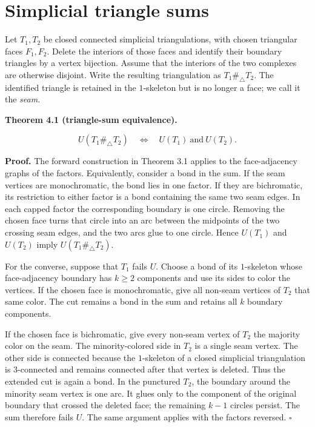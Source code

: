 \documentclass[11pt]{article}
\begin{document}
\section{Simplicial triangle sums}


Let $T_1,T_2$ be closed connected simplicial triangulations, with chosen
triangular faces $F_1,F_2$. Delete the interiors of those faces and identify
their boundary triangles by a vertex bijection. Assume that the interiors of
the two complexes are otherwise disjoint. Write the resulting triangulation
as $T_1\mathbin{\#_\triangle}T_2$. The identified triangle is retained in the
$1$-skeleton but is no longer a face; we call it the \emph{seam}.

\textbf{Theorem 4.1 (triangle-sum equivalence).}

\[
U(T_1\mathbin{\#_\triangle}T_2)
\quad\Longleftrightarrow\quad
U(T_1)\ \text{and}\ U(T_2).
\]

\textbf{Proof.} The forward construction in Theorem 3.1 applies to the
face-adjacency graphs of the factors. Equivalently, consider a bond in the
sum. If the seam vertices are monochromatic, the bond lies in one factor. If
they are bichromatic, its restriction to either factor is a bond containing
the same two seam edges. In each capped factor the corresponding boundary is
one circle. Removing the chosen face turns that circle into an arc between
the midpoints of the two crossing seam edges, and the two arcs glue to one
circle. Hence $U(T_1)$ and $U(T_2)$ imply $U(T_1\mathbin{\#_\triangle}T_2)$.

For the converse, suppose that $T_1$ fails $U$. Choose a bond of its
$1$-skeleton whose face-adjacency boundary has $k\geq2$ components and use
its sides to color the vertices. If the chosen face is monochromatic, give
all non-seam vertices of $T_2$ that same color. The cut remains a bond in the
sum and retains all $k$ boundary components.

If the chosen face is bichromatic, give every non-seam vertex of $T_2$ the
majority color on the seam. The minority-colored side in $T_2$ is a single
seam vertex. The other side is connected because the $1$-skeleton of a closed
simplicial triangulation is $3$-connected and remains connected after that
vertex is deleted. Thus the extended cut is again a bond. In the punctured
$T_2$, the boundary around the minority seam vertex is one arc. It glues only
to the component of the original boundary that crossed the deleted face; the
remaining $k-1$ circles persist. The sum therefore fails $U$. The same
argument applies with the factors reversed. $\square$
\end{document}

